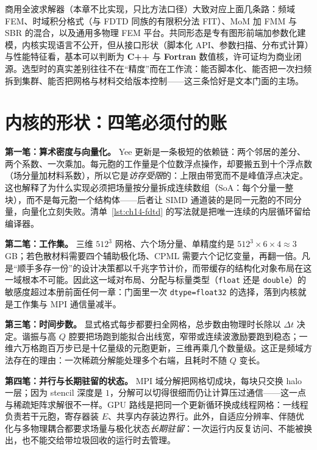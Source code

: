 \documentclass[12pt,a4paper,fontset=fandol]{ctexbook}
\newcommand{\Tp}[1]{\texttt{#1}}
\newcommand{\Bk}{\allowbreak}
\newcommand{\Lang}[1]{\textsf{\bfseries #1}}
\newcommand{\CPP}{\Lang{C++}}
\newcommand{\FTN}{\Lang{Fortran}}
\begin{document}
商用全波求解器（本章不比实现，只比方法口径）大致对应上面几条路：频域 FEM、时域积分格式（与 FDTD 同族的有限积分法 FIT）、MoM 加 FMM 与 SBR 的混合，以及通用多物理 FEM 平台。共同形态是专有图形前端加参数化建模，内核实现语言不公开，但从接口形状（脚本化 API、参数扫描、分布式计算）与性能特征看，基本可以判断为 \CPP{} 与 \FTN{} 数值核，许可证均为商业闭源。选型时的真实差别往往不在``精度''而在工作流：能否脚本化、能否把一次扫频拆到集群、能否把网格与材料交给版本控制——这三条恰好是文本门面的主场。

\section{内核的形状：四笔必须付的账}

\textbf{第一笔：算术密度与向量化。} Yee 更新是一条极短的依赖链：两个邻居的差分、两个系数、一次乘加。每元胞的工作量是个位数浮点操作，却要搬五到十个浮点数（场分量加材料系数），所以它是\emph{访存受限}的：上限由带宽而不是峰值浮点决定。这也解释了为什么实现必须把场量按分量拆成连续数组（SoA：每个分量一整块），而不是每元胞一个结构体——后者让 SIMD 通道装的是同一元胞的不同分量，向量化立刻失败。清单~\ref{lst:ch14-fdtd} 的写法就是把唯一连续的内层循环留给编译器。

\textbf{第二笔：工作集。} 三维 $512^{3}$ 网格、六个场分量、单精度约是 $512^{3} \times 6 \times 4 \approx 3$ GB；若色散材料需要四个辅助极化场、CPML 需要六个记忆变量，再翻一倍。凡是``顺手多存一份''的设计决策都以千兆字节计价，而带缓存的结构化对象布局在这一域根本不可能。因此这一域对布局、分配与标量类型（\Tp{float} 还是 \Tp{double}）的敏感度超过本册前面任何一章：门面里一次 \Tp{dtype=float32} \Bk{} 的选择，落到内核就是工作集与 MPI 通信量减半。

\textbf{第三笔：时间步数。} 显式格式每步都要扫全网格，总步数由物理时长除以 $\Delta t$ 决定。谐振与高 $Q$ 腔要把场跑到能拟合出线宽，窄带或连续波激励要跑到稳态；一维六万格跑百万步已是十亿量级的元胞更新，三维再乘几个数量级。这正是频域方法存在的理由：一次稀疏分解能处理多个右端，且耗时不随 $Q$ 变长。

\textbf{第四笔：并行与长期驻留的状态。} MPI 域分解把网格切成块，每块只交换 halo 一层；因为 stencil 深度是 $1$，分解可以切得很细而仍让计算压过通信——这一点与稀疏矩阵求解很不一样。GPU 路线是把同一个更新循环换成线程网格：一线程负责若干元胞，寄存器装 $E$、共享内存装边界行。此外，自适应分辨率、伴随优化与多物理耦合都要求场量与极化状态\emph{长期驻留}：一次运行内反复访问、不能被换出，也不能交给带垃圾回收的运行时去管理。
\end{document}
